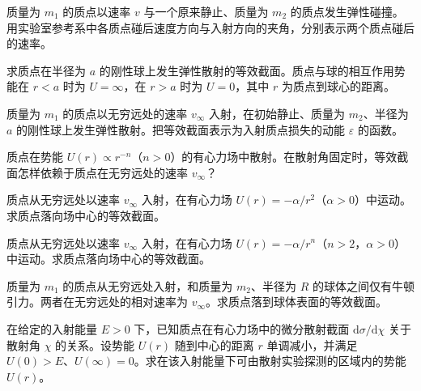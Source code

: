 \newpage
\noindent\begin{minipage}{\textwidth}
质量为 $m_1$ 的质点以速率 $v$ 与一个原来静止、质量为 $m_2$ 的质点发生弹性碰撞。用实验室参考系中各质点碰后速度方向与入射方向的夹角，分别表示两个质点碰后的速率。
\end{minipage}\par\vfill
\noindent\begin{minipage}{\textwidth}
求质点在半径为 $a$ 的刚性球上发生弹性散射的等效截面。质点与球的相互作用势能在 $r<a$ 时为 $U=\infty$，在 $r>a$ 时为 $U=0$，其中 $r$ 为质点到球心的距离。
\end{minipage}\par\vfill
\newpage
\noindent\begin{minipage}{\textwidth}
质量为 $m_1$ 的质点以无穷远处的速率 $v_\infty$ 入射，在初始静止、质量为 $m_2$、半径为 $a$ 的刚性球上发生弹性散射。把等效截面表示为入射质点损失的动能 $\varepsilon$ 的函数。
\end{minipage}\par\vfill
\noindent\begin{minipage}{\textwidth}
质点在势能 $U(r)\propto r^{-n}$（$n>0$）的有心力场中散射。在散射角固定时，等效截面怎样依赖于质点在无穷远处的速率 $v_\infty$？
\end{minipage}\par\vfill
\newpage
\noindent\begin{minipage}{\textwidth}
质点从无穷远处以速率 $v_\infty$ 入射，在有心力场 $U(r)=-\alpha/r^2$（$\alpha>0$）中运动。求质点落向场中心的等效截面。
\end{minipage}\par\vfill
\noindent\begin{minipage}{\textwidth}
质点从无穷远处以速率 $v_\infty$ 入射，在有心力场 $U(r)=-\alpha/r^n$（$n>2$，$\alpha>0$）中运动。求质点落向场中心的等效截面。
\end{minipage}\par\vfill
\newpage
\noindent\begin{minipage}{\textwidth}
质量为 $m_1$ 的质点从无穷远处入射，和质量为 $m_2$、半径为 $R$ 的球体之间仅有牛顿引力。两者在无穷远处的相对速率为 $v_\infty$。求质点落到球体表面的等效截面。
\end{minipage}\par\vfill
\noindent\begin{minipage}{\textwidth}
在给定的入射能量 $E>0$ 下，已知质点在有心力场中的微分散射截面 $\mathrm d\sigma/\mathrm d\chi$ 关于散射角 $\chi$ 的关系。设势能 $U(r)$ 随到中心的距离 $r$ 单调减小，并满足 $U(0)>E$、$U(\infty)=0$。求在该入射能量下可由散射实验探测的区域内的势能 $U(r)$。
\end{minipage}\par\vfill
